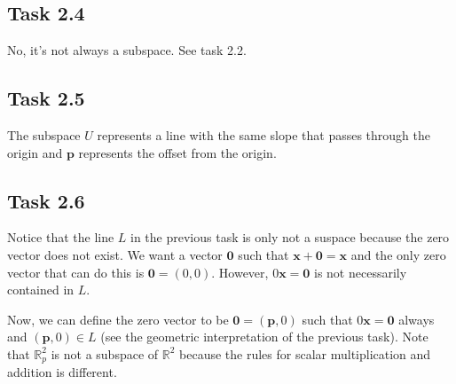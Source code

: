 \documentclass{article}
\begin{document}
\subsection*{Task 2.4}
No, it's not always a subspace. See task 2.2.
\subsection*{Task 2.5}
The subspace $U$ represents a line with the same slope that passes through the origin and $\bm{p}$ represents the offset from the origin.
\subsection*{Task 2.6}
Notice that the line $L$ in the previous task is only not a suspace because the zero vector does not exist. We want a vector $\bm{0}$ such that $\bm{x}+\bm{0}=\bm{x}$ and the only zero vector that can do this is $\bm{0}=(0,0)$. However, $0\bm{x}=\bm{0}$ is not necessarily contained in $L$.

Now, we can define the zero vector to be $\bm{0}=(\bm{p},0)$ such that $0\bm{x}=\bm{0}$ always and $(\bm{p},0) \in L$ (see the geometric interpretation of the previous task). Note that $\mathbb{R}^2_p$ is not a subspace of $\mathbb{R}^2$ because the rules for scalar multiplication and addition is different.
\end{document}
